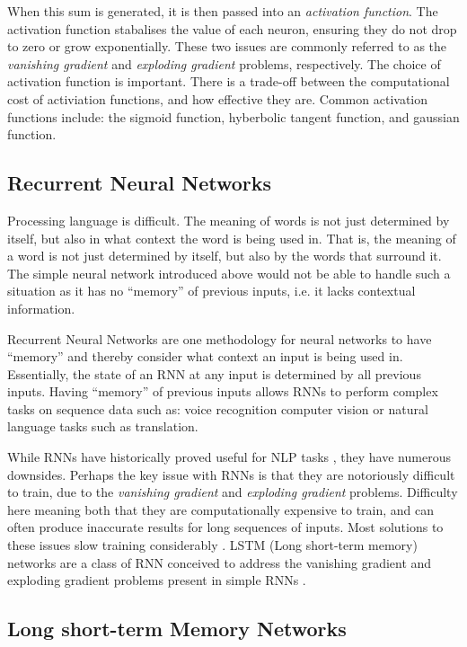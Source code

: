 When this sum is generated, it is then passed into an \emph{activation function}.
The activation function stabalises the value of each neuron, ensuring they do not drop to zero or grow exponentially.
These two issues are commonly referred to as
the \emph{vanishing gradient} and \emph{exploding gradient} problems, respectively. 
The choice of activation function is important. There is a trade-off between the computational cost of activiation
functions, and how effective they are. Common activation functions include: the sigmoid function,
hyberbolic tangent function, and gaussian function.

\subsection{Recurrent Neural Networks}

Processing language is difficult. The meaning of words is not just determined by itself, but also in what
context the word is being used in. That is, the meaning of a word is not just determined by itself,
but also by the words that surround it.
The simple neural network introduced above would not be able to handle such a situation as it has no ``memory''
of previous inputs, i.e. it lacks contextual information.

Recurrent Neural Networks are one methodology for neural networks to have ``memory'' 
and thereby consider what context an input is being used in.
Essentially, the state of an RNN at any input is determined by all previous inputs.
Having ``memory'' of previous inputs allows RNNs to perform complex tasks on sequence data such as: voice recognition
computer vision or natural language tasks such as translation. %

While RNNs have historically proved useful for NLP tasks \cite{DBLP:journals/corr/BahdanauCB14}, they have
numerous downsides. Perhaps the key issue with RNNs is that they are notoriously difficult to train,
due to the \emph{vanishing gradient} and \emph{exploding gradient} problems. Difficulty here meaning both 
that they are computationally expensive to train, and can often produce inaccurate results for long sequences of inputs.
Most solutions to these issues slow training considerably \cite{DBLP:journals/corr/abs-1211-5063}.
LSTM (Long short-term memory) networks are a class of RNN conceived
to address the vanishing gradient and exploding gradient problems present in simple RNNs
\cite{10.1162/neco.1997.9.8.1735}. 

\subsection{Long short-term Memory Networks}

